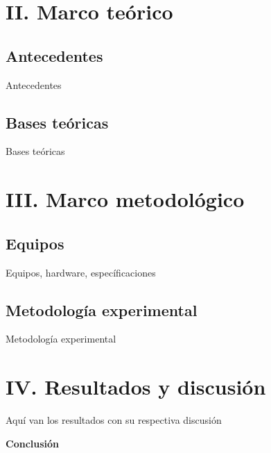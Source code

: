 \documentclass[12pt, letter paper]{report}
\begin{document}
  \chapter{II. Marco teórico} %
  \label{cha:ii_marco_teórico}
    \section{Antecedentes} %
    \label{sec:antecedentes}
      Antecedentes
    \section{Bases teóricas} %
    \label{sec:bases_teóricas}
      Bases teóricas

  \chapter{III. Marco metodológico} %
  \label{cha:iii_marco_metodológico}
    \section{Equipos} %
    \label{sec:equipos}
      Equipos, hardware, específicaciones

    \section{Metodología experimental} %
    \label{sec:metodología_experimental}
      Metodología experimental

  \chapter{IV. Resultados y discusión} %
  \label{cha:iv_resultados_y_discusión}
    Aquí van los resultados con su respectiva discusión

  \newpage
  \begin{center}
    \Large \textbf{Conclusión}
  \end{center}

  
  \nocite{*}
\end{document}
